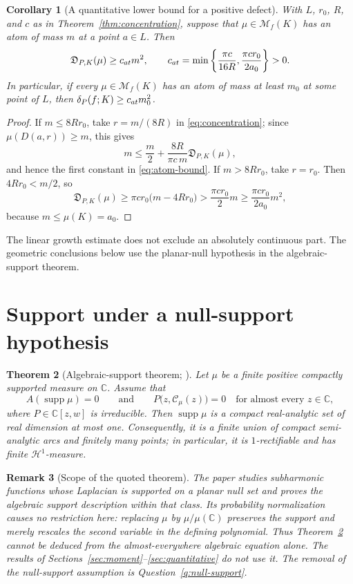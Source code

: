 \documentclass[10pt,a4paper]{amsart}
\newtheorem{theorem}{Theorem}[section]
\newtheorem{corollary}[theorem]{Corollary}
\newtheorem{remark}[theorem]{Remark}
\newcommand{\bC}{\mathbb C}
\newcommand{\M}{\mathcal M}
\newcommand{\Cauchy}{\mathcal C}
\newcommand{\supp}{\operatorname{supp}}
\newcommand{\Hone}{\mathcal H^1}
\begin{document}
\begin{corollary}[A quantitative lower bound for a positive defect]
\label{cor:atom-bound}
With $L$, $r_0$, $R$, and $c$ as in
Theorem~\ref{thm:concentration}, suppose that $\mu\in\M_f(K)$ has an atom of
mass $m$ at a point $a\in L$.  Then
\begin{equation}\label{eq:atom-bound}
 \mathfrak D_{P,K}(\mu)\ge c_{\rm at}m^2,
 \qquad
 c_{\rm at}
 =\min\left\{\frac{\pi c}{16R},\frac{\pi c r_0}{2a_0}\right\}>0.
\end{equation}
In particular, if every $\mu\in\M_f(K)$ has an atom of mass at least $m_0$ at
some point of $L$, then $\delta_P(f;K)\ge c_{\rm at}m_0^2$.
\end{corollary}

\begin{proof}
If $m\le8Rr_0$, take $r=m/(8R)$ in \eqref{eq:concentration}; since
$\mu(D(a,r))\ge m$, this gives
\[
 m\le\frac m2+\frac{8R}{\pi c\,m}\mathfrak D_{P,K}(\mu),
\]
and hence the first constant in \eqref{eq:atom-bound}.  If $m>8Rr_0$, take
$r=r_0$.  Then $4Rr_0<m/2$, so
\[
 \mathfrak D_{P,K}(\mu)
 \ge \pi c r_0\bigl(m-4Rr_0\bigr)
 >\frac{\pi c r_0}{2}m
 \ge\frac{\pi c r_0}{2a_0}m^2,
\]
because $m\le\mu(K)=a_0$.
\end{proof}

The linear growth estimate does not exclude an absolutely continuous part.
The geometric conclusions below use the planar-null hypothesis in the
algebraic-support theorem.

\section{Support under a null-support hypothesis}
\label{sec:support}

\begin{theorem}[Algebraic-support theorem; {\cite{BBB}}]
\label{thm:external-support}
Let $\mu$ be a finite positive compactly supported measure on $\bC$.  Assume
that
\[
 A(\supp\mu)=0
 \qquad\text{and}\qquad
 P\bigl(z,\Cauchy_\mu(z)\bigr)=0
 \quad\text{for almost every }z\in\bC,
\]
where $P\in\bC[z,w]$ is irreducible.  Then $\supp\mu$ is a compact
real-analytic set of real dimension at most one.  Consequently, it is a finite
union of compact semi-analytic arcs and finitely many points; in particular, it
is $1$-rectifiable and has finite
$\Hone$-measure.
\end{theorem}

\begin{remark}[Scope of the quoted theorem]
The paper \cite{BBB} studies subharmonic functions whose Laplacian is supported
on a planar null set and proves the algebraic support description within that
class.  Its probability normalization causes no restriction here: replacing
$\mu$ by $\mu/\mu(\bC)$ preserves the support and merely rescales the second
variable in the defining polynomial.  Thus Theorem~\ref{thm:external-support}
cannot be deduced from the almost-everywhere algebraic equation alone.  The results of
Sections~\ref{sec:moment}--\ref{sec:quantitative} do not use it.  The removal of
the null-support assumption is Question~\ref{q:null-support}.
\end{remark}
\end{document}
